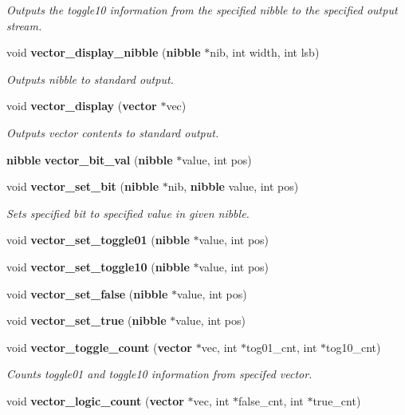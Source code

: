 \begin{CompactItemize}
\begin{CompactList}\small\item\em Outputs the toggle10 information from the specified nibble to the specified output stream.\item\end{CompactList}\item 
void {\bf vector\_\-display\_\-nibble} ({\bf nibble} $\ast$nib, int width, int lsb)
\begin{CompactList}\small\item\em Outputs nibble to standard output.\item\end{CompactList}\item 
void {\bf vector\_\-display} ({\bf vector} $\ast$vec)
\begin{CompactList}\small\item\em Outputs vector contents to standard output.\item\end{CompactList}\item 
{\bf nibble} {\bf vector\_\-bit\_\-val} ({\bf nibble} $\ast$value, int pos)
\item 
void {\bf vector\_\-set\_\-bit} ({\bf nibble} $\ast$nib, {\bf nibble} value, int pos)
\begin{CompactList}\small\item\em Sets specified bit to specified value in given nibble.\item\end{CompactList}\item 
void {\bf vector\_\-set\_\-toggle01} ({\bf nibble} $\ast$value, int pos)
\item 
void {\bf vector\_\-set\_\-toggle10} ({\bf nibble} $\ast$value, int pos)
\item 
void {\bf vector\_\-set\_\-false} ({\bf nibble} $\ast$value, int pos)
\item 
void {\bf vector\_\-set\_\-true} ({\bf nibble} $\ast$value, int pos)
\item 
void {\bf vector\_\-toggle\_\-count} ({\bf vector} $\ast$vec, int $\ast$tog01\_\-cnt, int $\ast$tog10\_\-cnt)
\begin{CompactList}\small\item\em Counts toggle01 and toggle10 information from specifed vector.\item\end{CompactList}\item 
void {\bf vector\_\-logic\_\-count} ({\bf vector} $\ast$vec, int $\ast$false\_\-cnt, int $\ast$true\_\-cnt)

\end{CompactItemize}
